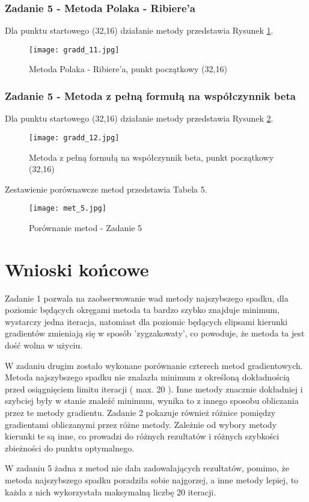 \documentclass[a4paper,15pt]{article}
\begin{document}
\subsubsection{Zadanie 5 - Metoda Polaka - Ribiere'a }
Dla punktu startowego (32,16) działanie metody przedstawia Rysunek \ref{fig:gradd_11}.
\begin{figure}[H]
\centerline{\texttt{[image: gradd\_11.jpg]}}
\centering
\caption{Metoda Polaka - Ribiere'a, punkt początkowy (32,16) }
\label{fig:gradd_11}
\end{figure}
\subsubsection{Zadanie 5 - Metoda z pełną formułą na współczynnik beta }
Dla punktu startowego (32,16) działanie metody przedstawia Rysunek \ref{fig:gradd_12}.
\begin{figure}[H]
\centerline{\texttt{[image: gradd\_12.jpg]}}
\centering
\caption{Metoda z pełną formułą na współczynnik beta, punkt początkowy (32,16) }
\label{fig:gradd_12}
\end{figure}

Zestawienie porównawcze metod przedstawia Tabela 5.  

\begin{figure}[H]
\centerline{\texttt{[image: met\_5.jpg]}}
\centering
\caption{Porównanie metod - Zadanie 5 }
\label{fig:met_5}
\end{figure}

\section{Wnioski końcowe}
Zadanie 1 pozwala na zaobserwowanie wad metody najszybszego spadku, dla poziomic będących okręgami metoda ta bardzo szybko znajduje minimum, wystarczy jedna iteracja, natomiast dla poziomic będących elipsami kierunki gradientów zmieniają się w sposób 'zygzakowaty', co powoduje, że metoda ta jest dość wolna w użyciu.

W zadaniu drugim zostało wykonane porównanie czterech metod gradientowych. Metoda najszybszego spadku nie znalazła minimum z określoną dokładnością przed osiągnięciem limitu iteracji ( max. 20 ). Inne metody znacznie dokładniej i szybciej były w stanie znaleźć minimum, wynika to z innego sposobu obliczania przez te metody gradientu. Zadanie 2 pokazuje również różnice pomiędzy gradientami obliczanymi przez różne metody. Zależnie od wybory metody kierunki te są inne, co prowadzi do różnych rezultatów i różnych szybkości zbieżności do punktu optymalnego.

W zadaniu 5 żadna z metod nie dała zadowalających rezultatów, pomimo, że metoda najszybszego spadku poradziła sobie najgorzej, a inne metody lepiej, to każda z nich wykorzystała maksymalną liczbę 20 iteracji. 
\end{document}

